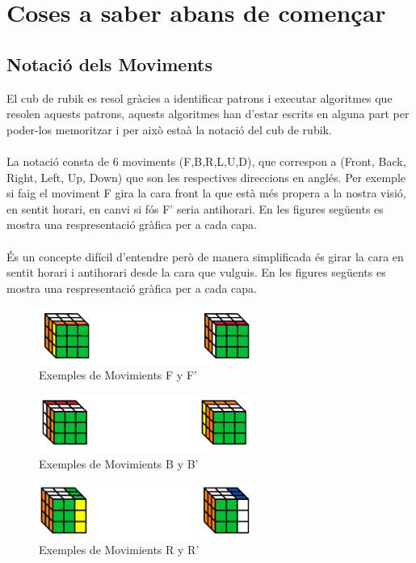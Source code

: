 \section{Coses a saber abans de començar}

\subsection{Notació dels Moviments}

El cub de rubik es resol gràcies a identificar patrons i executar algoritmes que resolen aquests patrons, aquests algoritmes han d'estar escrits en alguna part per poder-los memoritzar i per això estaà la notació del cub de rubik.
\\\\La notació consta de 6 moviments (F,B,R,L,U,D), que correspon a (Front, Back, Right, Left, Up, Down) que son les respectives direccions en anglés. Per exemple si faig el moviment F gira la cara front la que està més propera a la nostra visió, en sentit horari, en canvi si fós F' seria antihorari. En les figures següents es mostra una respresentació gràfica per a cada capa.
\\\\És un concepte difícil d'entendre però de manera simplificada és girar la cara en sentit horari i antihorari desde la cara que vulguis. En les figures següents es mostra una respresentació gràfica per a cada capa.

\begin{figure}[!ht]
    \centering
    \includegraphics[width=7cm]{img/cubes/moviment-F.png}
    \caption{Exemples de Movimients F y F'}
\end{figure}

\begin{figure}[!ht]
    \centering
    \includegraphics[width=7cm]{img/cubes/moviment-B.png}
    \caption{Exemples de Movimients B y B'}
\end{figure}

\begin{figure}[!ht]
    \centering
    \includegraphics[width=7cm]{img/cubes/moviment-R.png}
    \caption{Exemples de Movimients R y R'}
\end{figure}


